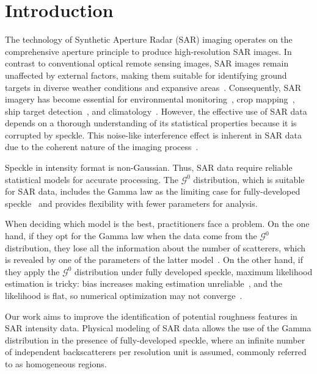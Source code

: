 \chapter{Introduction}\label{chp:int}


The technology of Synthetic Aperture Radar (SAR) imaging operates on the comprehensive aperture principle to produce high-resolution SAR images.
In contrast to conventional optical remote sensing images, SAR images remain unaffected by external factors, making them suitable for identifying ground targets in diverse weather conditions and expansive areas~\citep{Mu2019}.  
Consequently, SAR imagery has become essential for environmental monitoring~\citep{Amitrano2021}, crop mapping~\citep{DingleRobertson2020}, ship target detection~\citep{Wang2019}, and climatology~\citep{Zhao2023}.  
However, the effective use of SAR
data depends on a thorough understanding of its statistical properties
because it is corrupted by speckle. This noise-like interference effect
is inherent in SAR data due to the coherent nature of the imaging
process~\citep{Argenti2013}.

Speckle in intensity format is non-Gaussian. 
Thus, SAR data require reliable statistical models for accurate processing. 
The \(\mathcal{G}^0\) distribution, which is suitable for SAR data, includes
the Gamma law as the limiting case for fully-developed
speckle~\citep{Ferreira2020} and provides flexibility with fewer
parameters for analysis.

When deciding which model is the best, practitioners face a problem. 
On the one hand, if they opt for the Gamma law when the data come from the
\(\mathcal{G}^0\) distribution, they lose all the information about the
number of scatterers, which is revealed by one of the parameters of the
latter model~\citep{Yue2021}. 
On the other hand, if they apply the \(\mathcal{G}^0\) distribution under fully developed speckle, maximum
likelihood estimation is tricky: bias increases making estimation
unreliable~\citep{VasconcellosFrerySilva:CompStat}, and the likelihood is
flat, so numerical optimization may not
converge~\citep{FreryCribariSouza:JASP:04}. 

Our work aims to improve the identification of potential roughness
features in SAR intensity data. 
Physical modeling of SAR data allows the
use of the Gamma distribution in the presence of fully-developed
speckle, where an infinite number of independent backscatterers per
resolution unit is assumed, commonly referred to as homogeneous regions.

